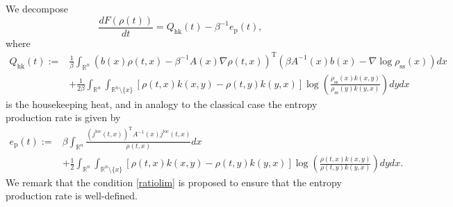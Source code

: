 \documentclass[10pt]{article}
\theoremstyle{definition}
\numberwithin{equation}{section}
\begin{document}
We decompose
\begin{equation*}
    \frac{dF(\rho(t))}{dt} = Q_\mathrm{hk}(t)- \beta^{-1}e_\mathrm{p}(t),
\end{equation*}
where 
\begin{align}\label{Def:Qhk}
    Q_\mathrm{hk}(t):= & \frac{1}{\beta}\int_{\mathbb{R}^n} (b(x)\rho(t,x) - \beta^{-1} A(x)\nabla \rho(t,x))^\mathrm{T}(\beta A^{-1}(x)b(x) - \nabla \log\rho_\mathrm{ss}(x) ) dx \nonumber\\
    & + \frac{1}{2\beta}\int_{\mathbb{R}^n}\int_{\mathbb{R}^n \setminus \{x\}} [\rho(t,x)k(x,y) - \rho(t,y)k(y,x)]\log \left( \frac{\rho_\mathrm{ss}(x) k(x,y)}{\rho_\mathrm{ss}(y)k(y,x)} \right) dydx 
\end{align}
is the housekeeping heat, and in analogy to the classical case \cite{S05} the entropy production rate is given by
\begin{align}\label{Def:EPR}
    e_\mathrm{p}(t) := & \beta\int_{\mathbb{R}^n}  \frac{(j^\mathrm{loc}(t,x))^\mathrm{T}A^{-1}(x)j^\mathrm{loc}(t,x)}{\rho(t,x)} dx \nonumber\\
    & + \frac{1}{2} \int_{\mathbb{R}^n}\int_{\mathbb{R}^n \setminus \{x\}} [\rho(t,x)k(x,y) - \rho(t,y)k(y,x)]\log \left( \frac{\rho(t,x)k(x,y)}{\rho(t,y)k(y,x)} \right) dydx.
\end{align}
We remark that the condition \eqref{ratiolim} is proposed to ensure that the entropy production rate is well-defined.
\end{document}
